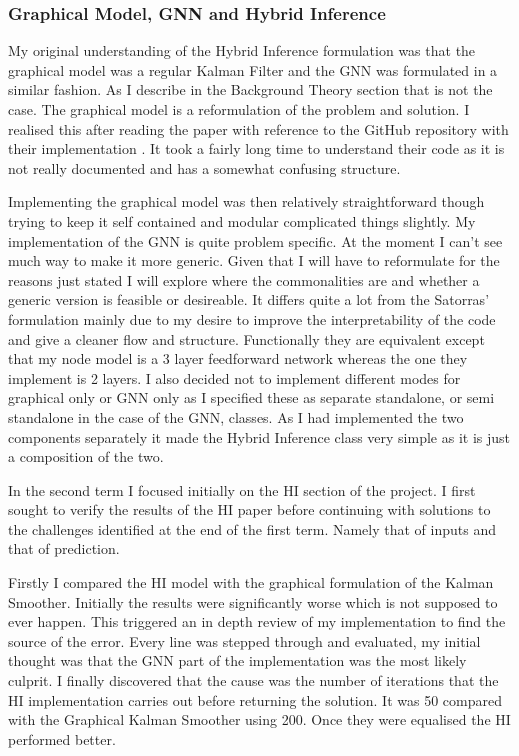 \documentclass[]{../resources/final_report}
\begin{document}
\subsubsection{Graphical Model, GNN and Hybrid Inference}

My original understanding of the Hybrid Inference formulation was that the graphical model was a 
regular Kalman Filter and the GNN was formulated in a similar fashion. As I describe in the Background 
Theory section that is not the case. The graphical model is a reformulation of the problem and 
solution. I realised this after reading the paper with reference to the GitHub repository with their 
implementation \cite{vgsatorrasgithub}. It took a fairly long time to understand their code as it is 
not really documented and has a somewhat confusing structure.

Implementing the graphical model was then relatively straightforward though trying to keep it self 
contained and modular complicated things slightly. My implementation of the GNN is quite problem 
specific. At the moment I can't see much way to make it more generic. Given that I will have to 
reformulate for the reasons just stated I will explore where the commonalities are and whether a 
generic version is feasible or desireable. It differs quite a lot from the Satorras' formulation 
mainly due to my desire to improve the interpretability of the code and give a cleaner flow and 
structure. Functionally they are equivalent except that my node model is a 3 layer feedforward 
network whereas the one they implement is 2 layers. I also decided not to implement different 
modes for graphical only or GNN only as I specified these as separate standalone, or semi 
standalone in the case of the GNN, classes. As I had implemented the two components separately 
it made the Hybrid Inference class very simple as it is just a composition of the two.

In the second term I focused initially on the HI section of the project. I first sought to 
verify the results of the HI paper before continuing with solutions to the challenges identified 
at the end of the first term. Namely that of inputs and that of prediction.


Firstly I compared the HI model with the graphical formulation of the Kalman Smoother.
Initially the results were significantly worse which is not supposed to ever happen.
This triggered an in depth review of my implementation to find the source of the error.
Every line was stepped through and evaluated, my initial thought was that the GNN part 
of the implementation was the most likely culprit. I finally discovered that the cause 
was the number of iterations that the HI implementation carries out before returning the 
solution. It was 50 compared with the Graphical Kalman Smoother using 200. Once they were
equalised the HI performed better.
\end{document}
